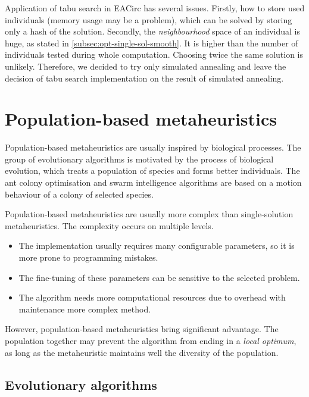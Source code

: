 \documentclass[
    digital,    %
    oneside,    %
    color,
    11pt,
    nocover,
    notable,
    nolof,
    nolot,
]{fithesis3}
\begin{document}
Application of tabu search in EACirc has several issues. Firstly, how to store used individuals (memory usage may be a problem), which can be solved by storing only a hash of the solution. Secondly, the \textit{neighbourhood} space of an individual is huge, as stated in \cref{subsec:opt-single-sol-smooth}. It is higher than the number of individuals tested during whole computation. Choosing twice the same solution is unlikely. Therefore, we decided to try only simulated annealing and leave the decision of tabu search implementation on the result of simulated annealing.

\section{Population-based metaheuristics}
\label{sec:opt-population}

Population-based metaheuristics are usually inspired by biological processes. The group of evolutionary algorithms is motivated by the process of biological evolution, which treats a population of species and forms better individuals. The ant colony optimisation and swarm intelligence algorithms are based on a motion behaviour of a colony of selected species.

Population-based metaheuristics are usually more complex than single-solution metaheuristics. The complexity occurs on multiple levels.

\begin{itemize}
    \item The implementation usually requires many configurable parameters, so it is more prone to programming mistakes.
    \item The fine-tuning of these parameters can be sensitive to the selected problem.
    \item The algorithm needs more computational resources due to overhead with maintenance more complex method.
\end{itemize}

However, population-based metaheuristics bring significant advantage. The population together may prevent the algorithm from ending in a \textit{local optimum}, as long as the metaheuristic maintains well the diversity of the population.

\subsection{Evolutionary algorithms}
\label{subsec:opt-popul-ea}
\end{document}

